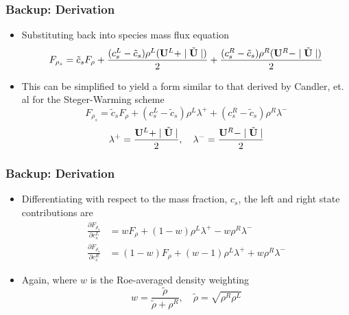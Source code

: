 \documentclass{beamer}
\begin{document}
\begin{frame}
  \frametitle{Backup: Derivation}
  \begin{itemize}
    \item Substituting back into species mass flux equation
    \[
      F_{\rho_s} =\tilde{c}_s F_\rho +
      \frac{(c_s^L-\tilde{c}_s)\rho^L({{\bf U}}^L+\mid \tilde{{\bf U}}\mid)}{2} +
      \frac{(c_s^R-\tilde{c}_s)\rho^R({{\bf U}}^R-\mid \tilde{{\bf U}}\mid)}{2}
    \]
  \item This can be simplified to yield a form similar to that derived by
    Candler, et. al for the Steger-Warming scheme
  \[
    F_{\rho_s} =\tilde{c}_s F_\rho +
    (c_s^L-\tilde{c}_s)\rho^L\lambda^+ + (c_s^R-\tilde{c}_s)\rho^R\lambda^-
  \]
  \[
    \lambda^+ = \frac{{{\bf U}}^L+\mid
    \tilde{{\bf U}}\mid}{2}, \quad \lambda^- = \frac{{{\bf U}}^R-\mid
    \tilde{{\bf U}}\mid}{2}
  \]
  \end{itemize}
\end{frame}
\begin{frame}
  \frametitle{Backup: Derivation}
  \begin{itemize}
    \item Differentiating with respect to the mass fraction, $c_s$, the left and
      right state contributions are
    \begin{align*} \frac{\partial F_{\rho_s}}{\partial c^L_s} &=
      wF_\rho+(1-w)\rho^L\lambda^+ - w\rho^R\lambda^- \\ 
      \frac{\partial F_{\rho_s}}{\partial c^R_s} &=
      (1-w)F_\rho+(w-1)\rho^L\lambda^+ + w\rho^R\lambda^- 
    \end{align*}
  \item Again, where $w$ is the Roe-averaged density weighting
    \[
    	w = \frac{\tilde{\rho}}{\tilde{\rho}+\rho^R},\quad
    	\tilde{\rho} = \sqrt{\rho^R\rho^L}
    \]
  \end{itemize}
\end{frame}
\end{document}

